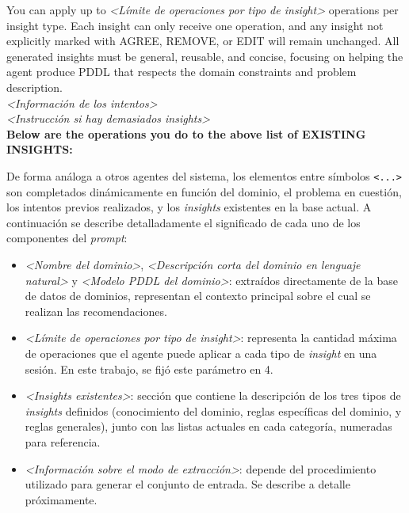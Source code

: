 \begin{anexes}
\begin{tcolorbox}[colback=gray!10!white, colframe=black, title=\textit{Prompt} del agente de \textit{insights}, fonttitle=\bfseries, breakable]
You can apply up to \textit{<Límite de operaciones por tipo de insight>} operations per insight type. Each insight can only receive one operation, and any insight not explicitly marked with AGREE, REMOVE, or EDIT will remain unchanged. All generated insights must be general, reusable, and concise, focusing on helping the agent produce PDDL that respects the domain constraints and problem description.\\

\textit{<Información de los intentos>}\\

\textit{<Instrucción si hay demasiados insights>}\\

\textbf{Below are the operations you do to the above list of EXISTING INSIGHTS:}
\end{tcolorbox}

De forma análoga a otros agentes del sistema, los elementos entre símbolos \texttt{<...>} son completados dinámicamente en función del dominio, el problema en cuestión, los intentos previos realizados, y los \textit{insights} existentes en la base actual. A continuación se describe detalladamente el significado de cada uno de los componentes del \textit{prompt}:

\begin{itemize}
    \item \textit{<Nombre del dominio>}, \textit{<Descripción corta del dominio en lenguaje natural>} y \textit{<Modelo PDDL del dominio>}: extraídos directamente de la base de datos de dominios, representan el contexto principal sobre el cual se realizan las recomendaciones.
    
    \item \textit{<Límite de operaciones por tipo de insight>}: representa la cantidad máxima de operaciones que el agente puede aplicar a cada tipo de \textit{insight} en una sesión. En este trabajo, se fijó este parámetro en 4.

    \item \textit{<Insights existentes>}: sección que contiene la descripción de los tres tipos de \textit{insights} definidos (conocimiento del dominio, reglas específicas del dominio, y reglas generales), junto con las listas actuales en cada categoría, numeradas para referencia.

    \item \textit{<Información sobre el modo de extracción>}: depende del procedimiento utilizado para generar el conjunto de entrada. Se describe a detalle próximamente.


\end{itemize}
\end{anexes}
